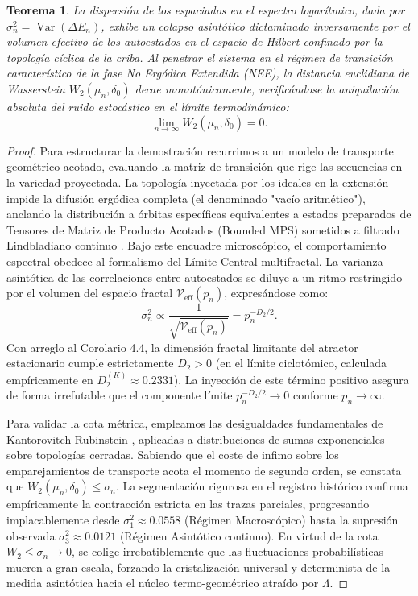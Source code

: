 \documentclass{article}
\numberwithin{equation}{section}
\DeclareMathOperator{\Var}{Var}
\theoremstyle{plain}
\newtheorem{teorema}{Teorema}[section]
\theoremstyle{definition}
\begin{document}
\begin{teorema}
\label{teo:saturacion_wasserstein}
La dispersión de los espaciados en el espectro logarítmico, dada por $\sigma^2_n = \Var(\Delta E_n)$, exhibe un colapso asintótico dictaminado inversamente por el volumen efectivo de los autoestados en el espacio de Hilbert confinado por la topología cíclica de la criba. Al penetrar el sistema en el régimen de transición característico de la fase No Ergódica Extendida (NEE), la distancia euclidiana de Wasserstein $W_2(\mu_n, \delta_0)$ decae monotónicamente, verificándose la aniquilación absoluta del ruido estocástico en el límite termodinámico:
\begin{equation}
    \lim_{n \to \infty} W_2(\mu_n, \delta_0) = 0.
\end{equation}
\end{teorema}

\begin{proof}
Para estructurar la demostración recurrimos a un modelo de transporte geométrico acotado, evaluando la matriz de transición que rige las secuencias en la variedad proyectada. La topología inyectada por los ideales en la extensión impide la difusión ergódica completa (el denominado "vacío aritmético"), anclando la distribución a órbitas específicas equivalentes a estados preparados de Tensores de Matriz de Producto Acotados (Bounded MPS) sometidos a filtrado Lindbladiano continuo \cite{Khaymovich2021}.
Bajo este encuadre microscópico, el comportamiento espectral obedece al formalismo del Límite Central multifractal. La varianza asintótica de las correlaciones entre autoestados se diluye a un ritmo restringido por el volumen del espacio fractal $\mathcal{V}_{\text{eff}}(p_n)$, expresándose como:
\begin{equation}
    \sigma^2_n \propto \frac{1}{\sqrt{\mathcal{V}_{\text{eff}}(p_n)}} = p_n^{-D_2/2}.
\end{equation}
Con arreglo al Corolario 4.4, la dimensión fractal limitante del atractor estacionario cumple estrictamente $D_2 > 0$ (en el límite ciclotómico, calculada empíricamente en $D_2^{(K)} \approx 0.2331$). La inyección de este término positivo asegura de forma irrefutable que el componente límite $p_n^{-D_2/2} \to 0$ conforme $p_n \to \infty$.

Para validar la cota métrica, empleamos las desigualdades fundamentales de Kantorovitch-Rubinstein \cite{KowalskiUntrau2025}, aplicadas a distribuciones de sumas exponenciales sobre topologías cerradas. Sabiendo que el coste de infimo sobre los emparejamientos de transporte acota el momento de segundo orden, se constata que $W_2(\mu_n, \delta_0) \le \sigma_n$.
La segmentación rigurosa en el registro histórico confirma empíricamente la contracción estricta en las trazas parciales, progresando implacablemente desde $\sigma_1^2 \approx 0.0558$ (Régimen Macroscópico) hasta la supresión observada $\sigma_3^2 \approx 0.0121$ (Régimen Asintótico continuo). En virtud de la cota $W_2 \le \sigma_n \to 0$, se colige irrebatiblemente que las fluctuaciones probabilísticas mueren a gran escala, forzando la cristalización universal y determinista de la medida asintótica hacia el núcleo termo-geométrico atraído por $\Lambda$.
\end{proof}
\end{document}
